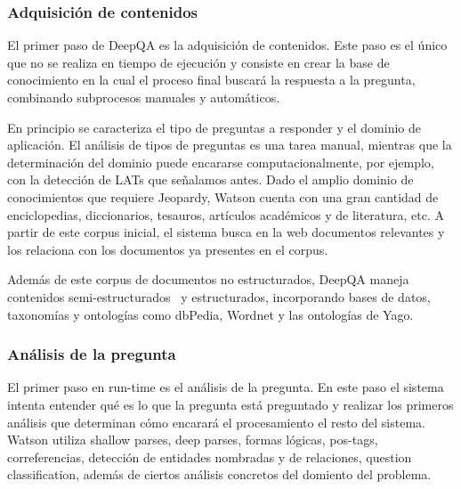 \subsubsection{Adquisici\'on de contenidos}

El primer paso de DeepQA es la adquisici\'on de contenidos. Este paso es
el \'unico que no se realiza en tiempo de ejecuci\'on y consiste en
crear la base de conocimiento en la cual el proceso final buscar\'a la
respuesta a la pregunta, combinando subprocesos manuales y
autom\'aticos. 

En principio se caracteriza el tipo de preguntas a responder y el
dominio de aplicaci\'on. El an\'alisis de tipos de preguntas es una
tarea manual, mientras que la determinaci\'on del dominio puede
encararse computacionalmente, por ejemplo, con la detecci\'on de LATs
que se\~nalamos antes. Dado el amplio dominio de conocimientos que
requiere Jeopardy, Watson cuenta con una gran cantidad de
enciclopedias, diccionarios, tesauros, art\'iculos acad\'emicos y de
literatura, etc. A partir de este corpus inicial, el sistema busca en
la web documentos relevantes y los relaciona con los documentos ya
presentes en el corpus. 

Adem\'as de este corpus de documentos no estructurados, DeepQA maneja
contenidos semi-estructurados \ y estructurados, incorporando bases de
datos, taxonom\'ias y ontolog\'ias como dbPedia, Wordnet y las
ontolog\'ias de Yago. 

\subsubsection{An\'alisis de la pregunta}

El primer paso en run-time es el an\'alisis de la pregunta. En este paso
el sistema intenta entender qu\'e es lo que la pregunta est\'a
preguntado y realizar los primeros an\'alisis que determinan c\'omo
encarar\'a el procesamiento el resto del sistema. Watson utiliza
shallow parses, deep parses, formas l\'ogicas, pos-tags,
correferencias, detecci\'on de entidades nombradas y de relaciones,
question classification, adem\'as de ciertos an\'alisis concretos del
domiento del problema.

